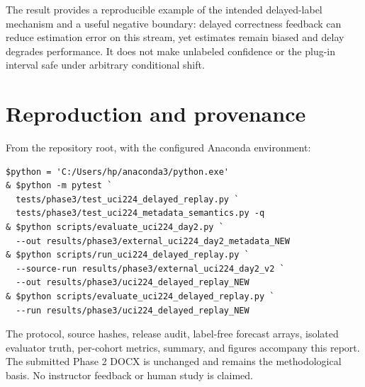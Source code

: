 \documentclass[10pt,a4paper]{article}
\begin{document}
The result provides a reproducible example of the intended delayed-label mechanism and a useful negative boundary: delayed correctness feedback can reduce estimation error on this stream, yet estimates remain biased and delay degrades performance. It does not make unlabeled confidence or the plug-in interval safe under arbitrary conditional shift.

\section*{Reproduction and provenance}
From the repository root, with the configured Anaconda environment:
\begin{verbatim}
$python = 'C:/Users/hp/anaconda3/python.exe'
& $python -m pytest `
  tests/phase3/test_uci224_delayed_replay.py `
  tests/phase3/test_uci224_metadata_semantics.py -q
& $python scripts/evaluate_uci224_day2.py `
  --out results/phase3/external_uci224_day2_metadata_NEW
& $python scripts/run_uci224_delayed_replay.py `
  --source-run results/phase3/external_uci224_day2_v2 `
  --out results/phase3/uci224_delayed_replay_NEW
& $python scripts/evaluate_uci224_delayed_replay.py `
  --run results/phase3/uci224_delayed_replay_NEW
\end{verbatim}
The protocol, source hashes, release audit, label-free forecast arrays, isolated evaluator truth, per-cohort metrics, summary, and figures accompany this report. The submitted Phase 2 DOCX is unchanged and remains the methodological basis. No instructor feedback or human study is claimed.
\end{document}

